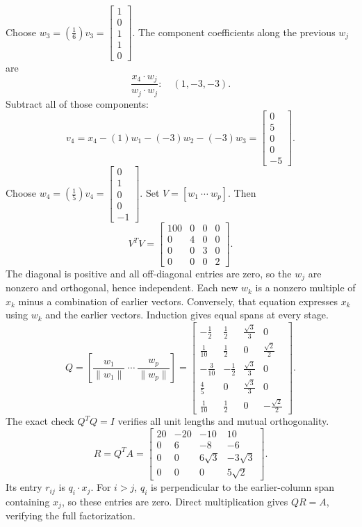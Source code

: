 Choose $w_{3}=(\frac{1}{6})v_{3}=\left[\begin{array}{r}1\\0\\1\\1\\0\end{array}\right]$.
The component coefficients along the previous $w_j$ are
\[\frac{x_{4}\cdot w_j}{w_j\cdot w_j}:\quad(1,-3,-3).\]
Subtract all of those components:
\[v_{4}=x_{4}-(1)w_{1}-(-3)w_{2}-(-3)w_{3}=\left[\begin{array}{r}0\\5\\0\\0\\-5\end{array}\right].\]
Choose $w_{4}=(\frac{1}{5})v_{4}=\left[\begin{array}{r}0\\1\\0\\0\\-1\end{array}\right]$.
Set $V=[w_1\ \cdots\ w_p]$. Then
\[V^TV=\left[\begin{array}{rrrr}100&0&0&0\\0&4&0&0\\0&0&3&0\\0&0&0&2\end{array}\right].\]
The diagonal is positive and all off-diagonal entries are zero, so the $w_j$ are nonzero and orthogonal, hence independent. Each new $w_k$ is a nonzero multiple of $x_k$ minus a combination of earlier vectors. Conversely, that equation expresses $x_k$ using $w_k$ and the earlier vectors. Induction gives equal spans at every stage.
\[Q=\left[\frac{w_1}{\|w_1\|}\ \cdots\ \frac{w_p}{\|w_p\|}\right]=\left[\begin{array}{rrrr}- \frac{1}{2}&\frac{1}{2}&\frac{\sqrt{3}}{3}&0\\\frac{1}{10}&\frac{1}{2}&0&\frac{\sqrt{2}}{2}\\- \frac{3}{10}&- \frac{1}{2}&\frac{\sqrt{3}}{3}&0\\\frac{4}{5}&0&\frac{\sqrt{3}}{3}&0\\\frac{1}{10}&\frac{1}{2}&0&- \frac{\sqrt{2}}{2}\end{array}\right].\]
The exact check $Q^TQ=I$ verifies all unit lengths and mutual orthogonality.
\[R=Q^TA=\left[\begin{array}{rrrr}20&-20&-10&10\\0&6&-8&-6\\0&0&6 \sqrt{3}&- 3 \sqrt{3}\\0&0&0&5 \sqrt{2}\end{array}\right].\]
Its entry $r_{ij}$ is $q_i\cdot x_j$. For $i>j$, $q_i$ is perpendicular to the earlier-column span containing $x_j$, so these entries are zero. Direct multiplication gives $QR=A$, verifying the full factorization.

